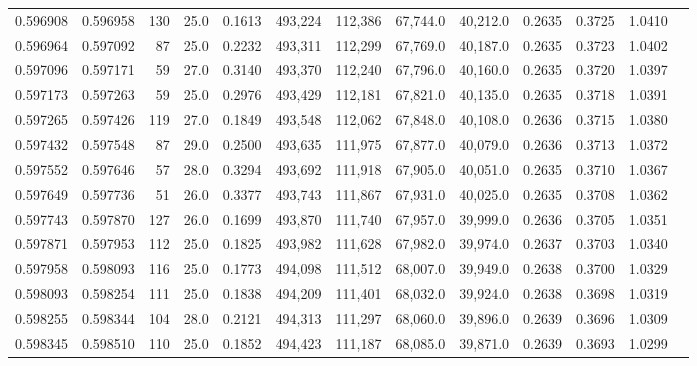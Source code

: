 \begin{tabular}{rrrrrrrrrrrrr}
0.596908 & 0.596958 &   130 & 25.0 &                                     0.1613 & 493,224 & 112,386 &  67,744.0 &  40,212.0 & 0.2635 & 0.3725 & 1.0410 \\
0.596964 & 0.597092 &    87 & 25.0 &                                     0.2232 & 493,311 & 112,299 &  67,769.0 &  40,187.0 & 0.2635 & 0.3723 & 1.0402 \\
0.597096 & 0.597171 &    59 & 27.0 &                                     0.3140 & 493,370 & 112,240 &  67,796.0 &  40,160.0 & 0.2635 & 0.3720 & 1.0397 \\
0.597173 & 0.597263 &    59 & 25.0 &                                     0.2976 & 493,429 & 112,181 &  67,821.0 &  40,135.0 & 0.2635 & 0.3718 & 1.0391 \\
0.597265 & 0.597426 &   119 & 27.0 &                                     0.1849 & 493,548 & 112,062 &  67,848.0 &  40,108.0 & 0.2636 & 0.3715 & 1.0380 \\
0.597432 & 0.597548 &    87 & 29.0 &                                     0.2500 & 493,635 & 111,975 &  67,877.0 &  40,079.0 & 0.2636 & 0.3713 & 1.0372 \\
0.597552 & 0.597646 &    57 & 28.0 &                                     0.3294 & 493,692 & 111,918 &  67,905.0 &  40,051.0 & 0.2635 & 0.3710 & 1.0367 \\
0.597649 & 0.597736 &    51 & 26.0 &                                     0.3377 & 493,743 & 111,867 &  67,931.0 &  40,025.0 & 0.2635 & 0.3708 & 1.0362 \\
0.597743 & 0.597870 &   127 & 26.0 &                                     0.1699 & 493,870 & 111,740 &  67,957.0 &  39,999.0 & 0.2636 & 0.3705 & 1.0351 \\
0.597871 & 0.597953 &   112 & 25.0 &                                     0.1825 & 493,982 & 111,628 &  67,982.0 &  39,974.0 & 0.2637 & 0.3703 & 1.0340 \\
0.597958 & 0.598093 &   116 & 25.0 &                                     0.1773 & 494,098 & 111,512 &  68,007.0 &  39,949.0 & 0.2638 & 0.3700 & 1.0329 \\
0.598093 & 0.598254 &   111 & 25.0 &                                     0.1838 & 494,209 & 111,401 &  68,032.0 &  39,924.0 & 0.2638 & 0.3698 & 1.0319 \\
0.598255 & 0.598344 &   104 & 28.0 &                                     0.2121 & 494,313 & 111,297 &  68,060.0 &  39,896.0 & 0.2639 & 0.3696 & 1.0309 \\
0.598345 & 0.598510 &   110 & 25.0 &                                     0.1852 & 494,423 & 111,187 &  68,085.0 &  39,871.0 & 0.2639 & 0.3693 & 1.0299 \\

\end{tabular}
